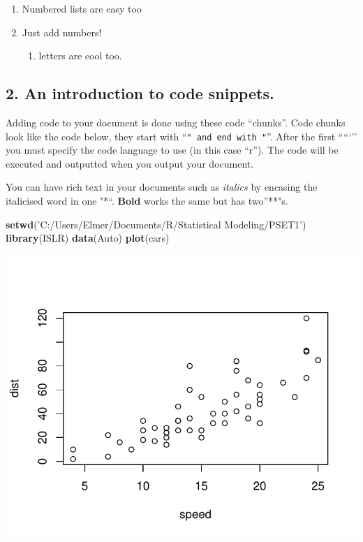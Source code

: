\documentclass[]{article}
\newenvironment{Shaded}{\begin{snugshade}}{\end{snugshade}}
\newcommand{\KeywordTok}[1]{\textcolor[rgb]{0.13,0.29,0.53}{\textbf{#1}}}
\newcommand{\NormalTok}[1]{#1}
\newcommand{\StringTok}[1]{\textcolor[rgb]{0.31,0.60,0.02}{#1}}
\providecommand{\tightlist}{%
  \setlength{\itemsep}{0pt}\setlength{\parskip}{0pt}}
\begin{document}
\begin{enumerate}
\def\labelenumi{\arabic{enumi}.}
\item
  Numbered lists are easy too
\item
  Just add numbers!

  \begin{enumerate}
  \def\labelenumii{\alph{enumii})}
  \tightlist
  \item
    letters are cool too.
  \end{enumerate}
\end{enumerate}

\hypertarget{an-introduction-to-code-snippets.}{%
\subsection{2. An introduction to code
snippets.}\label{an-introduction-to-code-snippets.}}

Adding code to your document is done using these code ``chunks''. Code
chunks look like the code below, they start with
``\texttt{"\ and\ end\ with\ "}''. After the first `````'' you must
specify the code language to use (in this case ``r''). The code will be
executed and outputted when you output your document.

You can have rich text in your documents such as \emph{italics} by
encasing the italicised word in one "*``. \textbf{Bold} works the same
but has two''**"s.

\begin{Shaded}
\begin{Highlighting}[]
\KeywordTok{setwd}\NormalTok{(}\StringTok{'C:/Users/Elmer/Documents/R/Statistical Modeling/PSET1'}\NormalTok{)}
\KeywordTok{library}\NormalTok{(ISLR)}
\KeywordTok{data}\NormalTok{(Auto)}
\KeywordTok{plot}\NormalTok{(cars)}
\end{Highlighting}
\end{Shaded}

\begin{center}\includegraphics{RMarkdown_Pset_Template_files/figure-latex/unnamed-chunk-2-1} \end{center}
\end{document}
